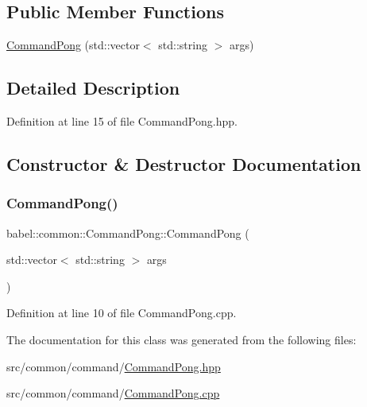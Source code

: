 \subsection*{Public Member Functions}
\begin{DoxyCompactItemize}
\item 
\mbox{\hyperlink{classbabel_1_1common_1_1_command_pong_a7439e8a9a1d337d868a7101d888ca564}{Command\+Pong}} (std\+::vector$<$ std\+::string $>$ args)
\end{DoxyCompactItemize}


\subsection{Detailed Description}


Definition at line 15 of file Command\+Pong.\+hpp.



\subsection{Constructor \& Destructor Documentation}
\mbox{\label{classbabel_1_1common_1_1_command_pong_a7439e8a9a1d337d868a7101d888ca564}} 
\subsubsection{\texorpdfstring{Command\+Pong()}{CommandPong()}}
{\footnotesize\ttfamily babel\+::common\+::\+Command\+Pong\+::\+Command\+Pong (\begin{DoxyParamCaption}\item[{std\+::vector$<$ std\+::string $>$}]{args }\end{DoxyParamCaption})}



Definition at line 10 of file Command\+Pong.\+cpp.



The documentation for this class was generated from the following files\+:\begin{DoxyCompactItemize}
\item 
src/common/command/\mbox{\hyperlink{_command_pong_8hpp}{Command\+Pong.\+hpp}}\item 
src/common/command/\mbox{\hyperlink{_command_pong_8cpp}{Command\+Pong.\+cpp}}\end{DoxyCompactItemize}
